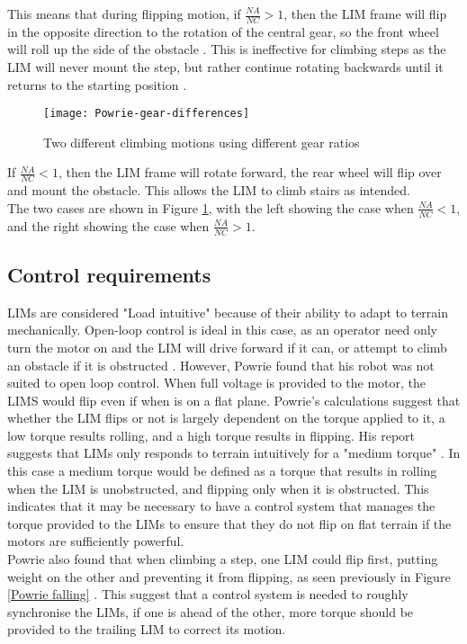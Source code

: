 This means that during flipping motion, if $\frac{NA}{NC} > 1$, then the LIM frame will flip in the opposite direction to the rotation of the central gear, so the front wheel will roll up the side of the obstacle \citep{Wilson-2013}. This is ineffective for climbing steps as the LIM will never mount the step, but rather continue rotating backwards until it returns to the starting position \citep{Haskel-2017}.\\

\begin{figure}[h]
	\centering
	\texttt{[image: Powrie-gear-differences]}
	\caption{Two different climbing motions using different gear ratios \citep{Powrie-2019}}
	\label{Powrie gears}
\end{figure}

If $\frac{NA}{NC} < 1$, then the LIM frame will rotate forward, the rear wheel will flip over and mount the obstacle. This allows the LIM to climb stairs as intended.\\
The two cases are shown in Figure \ref{Powrie gears}, with the left showing the case when $\frac{NA}{NC} < 1$, and the right showing the case when $\frac{NA}{NC} > 1$.



\subsection{Control requirements} %

LIMs are considered "Load intuitive" because of their ability to adapt to terrain mechanically. Open-loop control is ideal in this case, as an operator need only turn the motor on and the LIM will drive forward if it can, or attempt to climb an obstacle if it is obstructed \citep{Wilson-2013}. However, Powrie found that his robot was not suited to open loop control. When full voltage is provided to the motor, the LIMS would flip even if when is on a flat plane. Powrie's calculations suggest that whether the LIM flips or not is largely dependent on the torque applied to it, a low torque results rolling, and a high torque results in flipping. His report suggests that LIMs only responds to terrain intuitively for a "medium torque" \citep{Powrie-2019}. In this case a medium torque would be defined as a torque that results in rolling when the LIM is unobstructed, and flipping only when it is obstructed. This indicates that it may be necessary to have a control system that manages the torque provided to the LIMs to ensure that they do not flip on flat terrain if the motors are sufficiently powerful.\\

Powrie also found that when climbing a step, one LIM could flip first, putting weight on the other and preventing it from flipping, as seen previously in Figure \ref{Powrie falling} \citep{Powrie-2019}. This suggest that a control system is needed to roughly synchronise the LIMs, if one is ahead of the other, more torque should be provided to the trailing LIM to correct its motion.